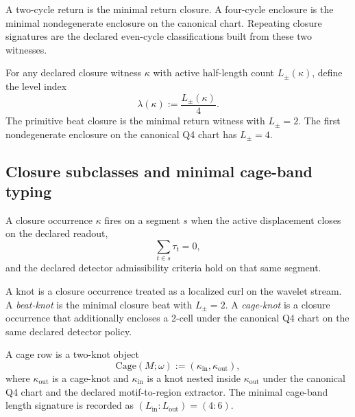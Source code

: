 \begin{definition}
\label{def:cycle-typing}
A two-cycle return is the minimal return closure. A four-cycle enclosure is the minimal nondegenerate enclosure on the canonical chart. Repeating closure signatures are the declared even-cycle classifications built from these two witnesses.
\end{definition}

\begin{definition}
\label{def:level-beat}
For any declared closure witness $\kappa$ with active half-length count $L_{\pm}(\kappa)$, define the level index
\[
\lambda(\kappa):=\frac{L_{\pm}(\kappa)}{4}.
\]
The primitive beat closure is the minimal return witness with $L_{\pm}=2$. The first nondegenerate enclosure on the canonical Q4 chart has $L_{\pm}=4$.
\end{definition}

\subsection{Closure subclasses and minimal cage-band typing}
\begin{definition}
\label{def:closure-predicate}
A closure occurrence $\kappa$ fires on a segment $s$ when the active displacement closes on the declared readout,
\[
\sum_{t\in s}\tau_t=0,
\]
and the declared detector admissibility criteria hold on that same segment.
\end{definition}

\begin{definition}
\label{def:beat-cage-knot}
A knot is a closure occurrence treated as a localized curl on the wavelet stream. A \emph{beat-knot} is the minimal closure beat with $L_{\pm}=2$. A \emph{cage-knot} is a closure occurrence that additionally encloses a 2-cell under the canonical Q4 chart on the same declared detector policy.
\end{definition}

\begin{definition}
\label{def:cage-band}
A cage row is a two-knot object
\[
\mathrm{Cage}(M;\omega):=(\kappa_{\mathrm{in}},\kappa_{\mathrm{out}}),
\]
where $\kappa_{\mathrm{out}}$ is a cage-knot and $\kappa_{\mathrm{in}}$ is a knot nested inside $\kappa_{\mathrm{out}}$ under the canonical Q4 chart and the declared motif-to-region extractor. The minimal cage-band length signature is recorded as $(L_{\mathrm{in}}:L_{\mathrm{out}})=(4{:}6)$.
\end{definition}

